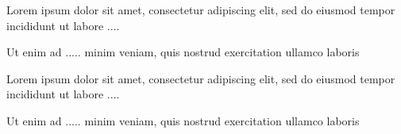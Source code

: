 \documentclass{article}
\begin{document}
\begin{question}{01}    
    Lorem ipsum dolor sit amet, consectetur adipiscing elit, sed do eiusmod tempor incididunt ut labore .... 
    \begin{choiceshoriz}
    \end{choiceshoriz}
\end{question}

\begin{question}{02}    
    Ut enim ad ..... minim veniam, quis nostrud exercitation ullamco laboris
    \begin{choiceshoriz}
    \end{choiceshoriz}
\end{question}

\begin{question}{03}    
  Lorem ipsum dolor sit amet, consectetur adipiscing elit, sed do eiusmod tempor incididunt ut labore .... 
  \begin{choiceshoriz}
  \end{choiceshoriz}
\end{question}

\begin{question}{04}    
  Ut enim ad ..... minim veniam, quis nostrud exercitation ullamco laboris
  \begin{choiceshoriz}
  \end{choiceshoriz}
\end{question}

\end{document}
